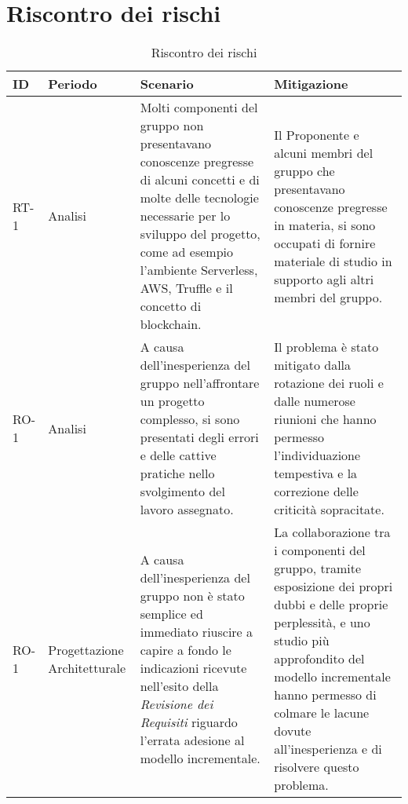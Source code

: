 \section{Riscontro dei rischi}
	\begin{longtable}{
		>{\centering}p{}
		>{\centering}p{}
		>{\centering\arraybackslash}p{}
		>{\centering\arraybackslash}p{} }

		\caption {Riscontro dei rischi} \\

		\textbf{\color{white}ID} &
		\textbf{\color{white}Periodo} &
		\textbf{\color{white}Scenario} &
		\textbf{\color{white}Mitigazione}
		\tabularnewline
		\endhead

		RT-1
		&
		Analisi
		&
		Molti componenti del gruppo \Gruppo{} non presentavano conoscenze pregresse di alcuni concetti e di molte delle tecnologie necessarie per lo sviluppo del progetto, come ad esempio l'ambiente\ped{\textit{G}} Serverless\ped{\textit{G}}, AWS\ped{\textit{G}}, Truffle\ped{\textit{G}} e il concetto di blockchain\ped{\textit{G}}.
		&
		Il Proponente\ped{\textit{G}} e alcuni membri del gruppo che presentavano conoscenze pregresse in materia, si sono occupati di fornire materiale di studio in supporto agli altri membri del gruppo.\\

		RO-1
		&
		Analisi
		&
		A causa dell'inesperienza del gruppo nell'affrontare un progetto complesso, si sono presentati degli errori e delle cattive pratiche nello svolgimento del lavoro assegnato.
		&
		Il problema è stato mitigato dalla rotazione dei ruoli e dalle numerose riunioni che hanno permesso l'individuazione tempestiva e la correzione delle criticità sopracitate.\\
\hline
		RO-1
		&
		Progettazione Architetturale
		&
		A causa dell'inesperienza del gruppo non è stato semplice ed immediato riuscire a capire a fondo le indicazioni ricevute nell'esito della \textit{Revisione dei Requisiti} riguardo l'errata adesione al modello incrementale.
		&
		La collaborazione tra i componenti del gruppo, tramite esposizione dei propri dubbi e delle proprie perplessità, e uno studio più approfondito del modello incrementale hanno permesso di colmare le lacune dovute all'inesperienza e di risolvere questo problema.\\


\end{longtable}

